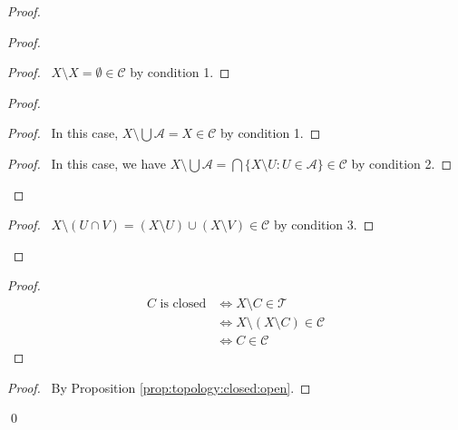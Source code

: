 \begin{proof}
  \pf
  \begin{proof}
    \begin{proof}
      \pf\ $X \setminus X = \emptyset \in \mathcal{C}$ by condition 1.
    \end{proof}
    \begin{proof}
      \begin{proof}
        \pf\ In this case, $X \setminus \bigcup \mathcal{A} = X \in
        \mathcal{C}$ by condition 1.
      \end{proof}
      \begin{proof}
        \pf\ In this case, we have $X \setminus \bigcup \mathcal{A} =
        \bigcap
        \{ X \setminus U : U \in \mathcal{A} \} \in \mathcal{C}$ by
        condition
        2.
      \end{proof}
    \end{proof}
    \begin{proof}
      \pf\ $X \setminus (U \cap V) = (X \setminus U) \cup (X \setminus V)
      \in
      \mathcal{C}$ by condition 3.
    \end{proof}
  \end{proof}
  \begin{proof}
    \pf
    \begin{align*}
      C \text{ is closed} & \Leftrightarrow X \setminus C \in \mathcal{T} \\
      & \Leftrightarrow X \setminus (X \setminus C) \in \mathcal{C} \\
      & \Leftrightarrow C \in \mathcal{C}
    \end{align*}
  \end{proof}
  \begin{proof}
    \pf\ By Proposition \ref{prop:topology:closed:open}.
  \end{proof}
  \qed
\end{proof}

